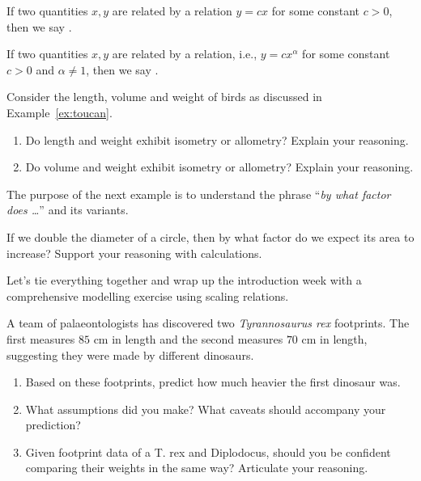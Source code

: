 \documentclass[../main.tex]{subfiles}
\begin{document}
\begin{mdframed}[style=simple-compact]
  If two quantities \(x,y\) are related by a  relation \(y = c x\) for some constant \(c > 0\), then we say .

  If two quantities \(x,y\) are related by a  relation, i.e., \(y = c x^{\alpha}\) for some constant \(c > 0\) and \(\alpha \ne 1\), then we say .
\end{mdframed}

\begin{example}
  Consider the length, volume and weight of birds as discussed in Example~\ref{ex:toucan}.

  \begin{enumerate}[wide]
    \item Do length and weight exhibit isometry or allometry? Explain your reasoning.

    \item Do volume and weight exhibit isometry or allometry? Explain your reasoning.
  \end{enumerate}
\end{example}

The purpose of the next example is to understand the phrase ``\emph{by what factor does \ldots{}}'' and its variants.
\begin{example}
  If we double the diameter of a circle, then by what factor do we expect its area to increase? Support your reasoning with calculations.
\end{example}

\clearpage
Let's tie everything together and wrap up the introduction week with a comprehensive modelling exercise using scaling relations.
\begin{example}
  A team of palaeontologists has discovered two \emph{Tyrannosaurus rex} footprints. The first measures \(85\) cm in length and the second measures \(70\) cm in length, suggesting they were made by different dinosaurs. 

  \begin{enumerate}[wide]
    \item Based on these footprints, predict how much heavier the first dinosaur was.


    \item What assumptions did you make? What caveats should accompany your prediction?

    \item Given footprint data of a T. rex and Diplodocus, should you be confident comparing their weights in the same way? Articulate your reasoning.
  \end{enumerate}
\end{example}
\end{document}
